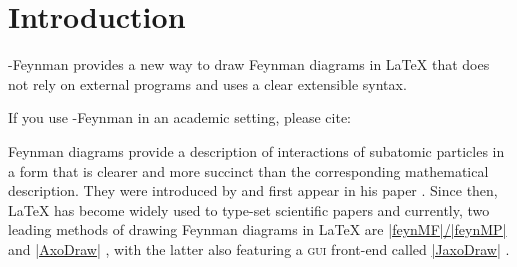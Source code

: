 \documentclass[a4paper,final]{ltxdoc}
\providecommand{\tikzfeynmanname}{\tikzname-Feynman}
\newif\ifarxiv
\begin{document}
\section{Introduction}
\label{sec:introduction}

\tikzfeynmanname{} provides a new way to draw Feynman diagrams in \LaTeX{} that
does not rely on external programs and uses a clear extensible syntax.

\ifarxiv\else
If you use \tikzfeynmanname{} in an academic setting, please cite:
\begin{quote}
\end{quote}
\fi

Feynman diagrams provide a description of interactions of subatomic particles in
a form that is clearer and more succinct than the corresponding mathematical
description.  They were introduced by \citeauthor{PhysRev.76.769} and first
appear in his paper  \cite{PhysRev.76.769}.  Since
then, \LaTeX{} has become widely used to type-set scientific papers and
currently, two leading methods of drawing Feynman diagrams in \LaTeX{} are
\href{https://www.ctan.org/pkg/feynmf}{|feynMF|/|feynMP|} \cite{feynmf} and
\href{https://www.ctan.org/pkg/axodraw}{|AxoDraw|} \cite{axodraw}, with the
latter also featuring a \textsc{gui} front-end called
\href{http://jaxodraw.sourceforge.net}{|JaxoDraw|} \cite{jaxodrawV1,jaxodrawV2}.
\end{document}
